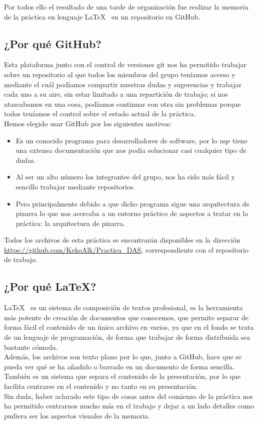 Por todos ello el resultado de una tarde de organización fue realizar la memoria de la práctica en lenguaje \LaTeX~ en un repositorio en GitHub\cite{repositorio}.

\subsection*{¿Por qué GitHub?}
Esta plataforma junto con el control de versiones git\cite{git} nos ha permitido trabajar sobre un repositorio al que todos los miembros del grupo teníamos acceso y mediante el cuál podíamos compartir nuestras dudas y sugerencias y trabajar cada uno a su aire, sin estar limitado a una repartición de trabajo; si nos atascabamos en una cosa, podíamos continuar con otra sin problemas porque todos teníamos el control sobre el estado actual de la práctica.\\

Hemos elegido usar GitHub por los siguientes motivos:
\begin{itemize}
	\item Es un conocido programa para desarrolladores de software, por lo uqe tiene una extensa documentación que nos podía solucionar casi cualquier tipo de dudas.
	\item Al ser un alto número los integrantes del grupo, nos ha sido más fácil y sencillo trabajar mediante repositorios. 
	\item Pero principalmente debido a que dicho programa sigue una arquitectura de pizarra lo que nos acercaba a un entorno práctico de aspectos a tratar en la práctica: la arquitectura de pizarra.
\end{itemize}

Todos los archivos de esta práctica se encontrarán disponibles en la dirección
\url{https://github.com/KekoAlk/Practica_DAS}, correspondiente con el repositorio de trabajo.

\subsection*{¿Por qué \LaTeX?}
\LaTeX~ es un sistema de composición de textos profesional, es la herramienta más potente de creación de documentos que conocemos, que permite separar de forma fácil el contenido de un único archivo en varios, ya que en el fondo se trata de un lenguaje de programación, de forma que trabajar de forma distribuida sea bastante cómoda.\\

Además, los archivos son texto plano por lo que, junto a GitHub, hace que se pueda ver qué se ha añadido o borrado en un documento de forma sencilla. También es un sistema que separa el contenido de la presentación, por lo que facilita centrarse en el contenido y no tanto en su presentación.\\

Sin duda, haber aclarado este tipo de cosas antes del comienzo de la práctica nos ha permitido centrarnos mucho más en el trabajo y dejar a un lado detalles como pudiera ser los aspectos visuales de la memoria.




